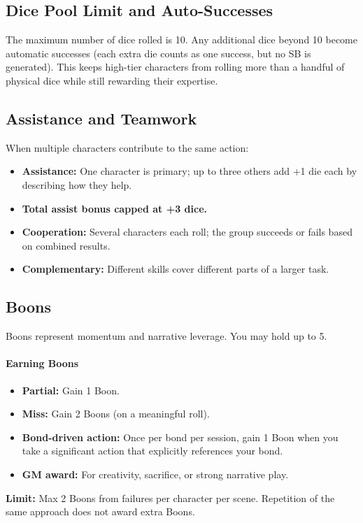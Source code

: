 \subsection{Dice Pool Limit and Auto-Successes}\label{subsec:dice_pool_limit}

The maximum number of dice rolled is 10. Any additional dice beyond 10 become
automatic successes (each extra die counts as one success, but no SB is
generated). This keeps high-tier characters from rolling more than a handful of
physical dice while still rewarding their expertise.

\subsection{Assistance and Teamwork}\label{subsec:assistance}

When multiple characters contribute to the same action:
\begin{itemize}
    \item \textbf{Assistance:} One character is primary; up to three others add
        +1 die each by describing how they help.
    \item \textbf{Total assist bonus capped at +3 dice.}
    \item \textbf{Cooperation:} Several characters each roll; the group succeeds
        or fails based on combined results.
    \item \textbf{Complementary:} Different skills cover different parts of a
        larger task.
\end{itemize}

\subsection{Boons}\label{subsec:boons}

Boons represent momentum and narrative leverage. You may hold up to 5.

\paragraph{Earning Boons}
\begin{itemize}
    \item \textbf{Partial:} Gain 1 Boon.
    \item \textbf{Miss:} Gain 2 Boons (on a meaningful roll).
    \item \textbf{Bond-driven action:} Once per bond per session, gain 1 Boon
        when you take a significant action that explicitly references your bond.
    \item \textbf{GM award:} For creativity, sacrifice, or strong narrative play.
\end{itemize}
\noindent \textbf{Limit:} Max 2 Boons from failures per character per scene.
Repetition of the same approach does not award extra Boons.


